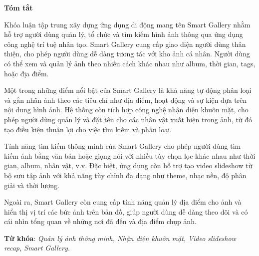 \begin{center}
\textbf{\large{Tóm tắt}	}
\end{center}


\begin{small}
    Khóa luận tập trung xây dựng ứng dụng di động mang tên Smart Gallery nhằm hỗ trợ người dùng quản lý, tổ chức và tìm kiếm hình ảnh thông qua ứng dụng công nghệ trí tuệ nhân tạo. Smart Gallery cung cấp giao diện người dùng thân thiện, cho phép người dùng dễ dàng tương tác với kho ảnh cá nhân. Người dùng có thể xem và quản lý ảnh theo nhiều cách khác nhau như album, thời gian, tags, hoặc địa điểm.

    Một trong những điểm nổi bật của Smart Gallery là khả năng tự động phân loại và gắn nhãn ảnh theo các tiêu chí như địa điểm, hoạt động và sự kiện dựa trên nội dung hình ảnh. Hệ thống còn tích hợp công nghệ nhận diện khuôn mặt, cho phép người dùng quản lý và đặt tên cho các nhân vật xuất hiện trong ảnh, từ đó tạo điều kiện thuận lợi cho việc tìm kiếm và phân loại.
    
    Tính năng tìm kiếm thông minh của Smart Gallery cho phép người dùng tìm kiếm ảnh bằng văn bản hoặc giọng nói với nhiều tùy chọn lọc khác nhau như thời gian, album, nhân vật, v.v. Đặc biệt, ứng dụng còn hỗ trợ tạo video slideshow từ bộ sưu tập ảnh với khả năng tùy chỉnh đa dạng như theme, nhạc nền, độ phân giải và thời lượng.
    
    Ngoài ra, Smart Gallery còn cung cấp tính năng quản lý địa điểm cho ảnh và hiển thị vị trí các bức ảnh trên bản đồ, giúp người dùng dễ dàng theo dõi và có cái nhìn tổng quan về những nơi đã đến và địa điểm chụp ảnh.


\vspace*{1cm}
\textbf{Từ khóa}: 
\textit{Quản lý ảnh thông minh, Nhận diện khuôn mặt, Video slideshow recap, Smart Gallery.}
\end{small}